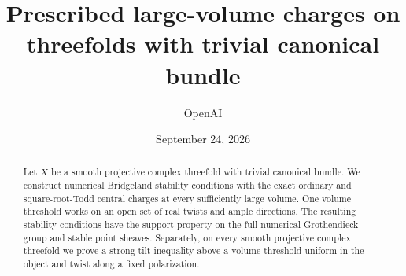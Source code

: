 \documentclass[11pt,a4paper]{article}
\title{Prescribed large-volume charges on threefolds with trivial canonical bundle}
\author{OpenAI}
\date{September 24, 2026}
\numberwithin{equation}{section}
\theoremstyle{definition}
\theoremstyle{remark}
\begin{document}
\maketitle
\begin{abstract}
Let $X$ be a smooth projective complex threefold with trivial canonical
bundle. We construct numerical Bridgeland stability conditions with the exact
ordinary and square-root-Todd central charges at every sufficiently large
volume. One volume threshold works on an open set of real twists and ample
directions. The resulting stability conditions have the support property on
the full numerical Grothendieck group and stable point sheaves. Separately, on
every smooth projective complex threefold we prove a strong tilt inequality
above a volume threshold uniform in the object and twist along a fixed
polarization.
\end{abstract}
\tableofcontents










\end{document}
